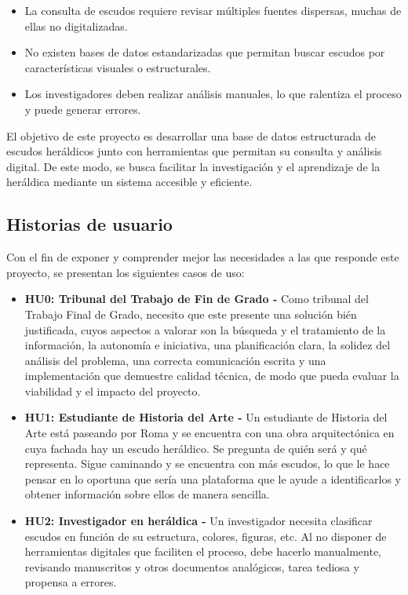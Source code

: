 \begin{itemize}
    \item La consulta de escudos requiere revisar múltiples fuentes dispersas, 
    muchas de ellas no digitalizadas.
    \item No existen bases de datos estandarizadas que permitan buscar escudos por
    características visuales o estructurales.
    \item Los investigadores deben realizar análisis manuales, lo que ralentiza el
    proceso y puede generar errores.
\end{itemize}

El objetivo de este proyecto es desarrollar una base de datos estructurada de escudos
heráldicos junto con herramientas que permitan su consulta y análisis digital. De este
modo, se busca facilitar la investigación y el aprendizaje de la heráldica mediante un
sistema accesible y eficiente.

\subsection{Historias de usuario}
Con el fin de exponer y comprender mejor las necesidades a las que responde este
proyecto, se presentan los siguientes casos de uso:

\begin{itemize}
    \item \textbf{HU0: Tribunal del Trabajo de Fin de Grado - } Como tribunal del Trabajo
    Final de Grado, necesito que este presente una solución bién justificada, cuyos
    aspectos a valorar son la búsqueda y el tratamiento de la información, la autonomía
    e iniciativa, una planificación clara, la solidez del análisis del problema, una 
    correcta comunicación escrita y una implementación que demuestre calidad técnica,
    de modo que pueda evaluar la viabilidad y el impacto del proyecto.
    \item \textbf{HU1: Estudiante de Historia del Arte - } Un estudiante de Historia del 
    Arte está paseando por Roma y se encuentra con una obra arquitectónica en cuya fachada
    hay un escudo heráldico. Se pregunta de quién será y qué representa. Sigue caminando 
    y se encuentra con más escudos, lo que le hace pensar en lo oportuna que sería una 
    plataforma que le ayude a identificarlos y obtener información sobre ellos de manera 
    sencilla.
    \item \textbf{HU2: Investigador en heráldica - } Un investigador necesita clasificar
    escudos en función de su estructura, colores, figuras, etc. Al no disponer de 
    herramientas digitales que faciliten el proceso, debe hacerlo manualmente, revisando
    manuscritos y otros documentos analógicos, tarea tediosa y propensa a errores.

\end{itemize}

